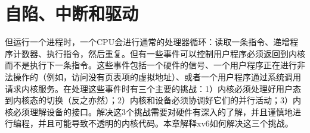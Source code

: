 \chapter{自陷、中断和驱动}

但运行一个进程时，一个CPU会进行通常的处理器循环：读取一条指令、递增程序计数器、执行指令，然后重复。但有一些事件可以控制用户程序必须返回到内核而不是执行下一条指令。这些事件包括一个硬件的信号、一个用户程序正在进行非法操作的（例如，访问没有页表项的虚拟地址）、或者一个用户程序通过系统调用请求内核服务。在处理这些事件时有三个主要的挑战：1）内核必须处理好用户态到内核态的切换（反之亦然）；2）内核和设备必须协调好它们的并行活动；3）内核必须理解设备的接口。解决这3个挑战需要对硬件有深入的了解，并且谨慎地进行编程，并且可能导致不透明的内核代码。本章解释xv6如何解决这三个挑战。